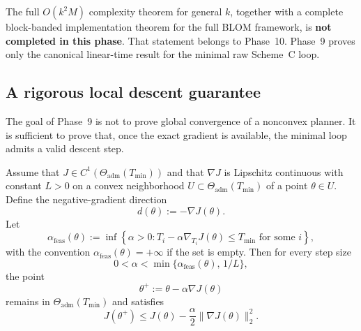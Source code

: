\begin{remark}
\label{rem:phase9_complexity_limitation}
The full \(O(k^2M)\) complexity theorem for general \(k\), together with a complete block-banded implementation theorem for the full BLOM framework, is \textbf{not completed in this phase}.
That statement belongs to Phase~10.
Phase~9 proves only the canonical linear-time result for the minimal raw Scheme~C loop.
\end{remark}

\subsection{A rigorous local descent guarantee}
\label{subsec:phase9_descent}

The goal of Phase~9 is not to prove global convergence of a nonconvex planner.
It is sufficient to prove that, once the exact gradient is available, the minimal loop admits a valid descent step.

\begin{theorem}
\label{thm:phase9_descent}
Assume that \(J\in C^1(\Theta_{\mathrm{adm}}(T_{\min}))\) and that \(\nabla J\) is Lipschitz continuous with constant \(L>0\) on a convex neighborhood \(U\subset\Theta_{\mathrm{adm}}(T_{\min})\) of a point \(\theta\in U\).
Define the negative-gradient direction
\[
d(\theta):=-\nabla J(\theta).
\]
Let
\begin{equation}
\label{eq:phase9_alpha_feas}
\alpha_{\mathrm{feas}}(\theta)
:=
\inf\left\{
\alpha>0:
T_i-\alpha \nabla_{T_i}J(\theta)\le T_{\min}
\text{ for some } i
\right\},
\end{equation}
with the convention \(\alpha_{\mathrm{feas}}(\theta)=+\infty\) if the set is empty.
Then for every step size
\[
0<\alpha<\min\{\alpha_{\mathrm{feas}}(\theta),\,1/L\},
\]
the point
\[
\theta^+ := \theta-\alpha \nabla J(\theta)
\]
remains in \(\Theta_{\mathrm{adm}}(T_{\min})\) and satisfies
\begin{equation}
\label{eq:phase9_descent_ineq}
J(\theta^+)
\le
J(\theta)
-
\frac{\alpha}{2}\|\nabla J(\theta)\|_2^2.
\end{equation}
\end{theorem}


